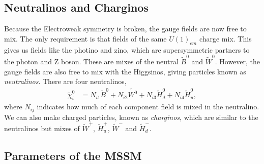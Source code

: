 \documentclass[twoside,english]{uiofysmaster}
\begin{document}
\subsection{Neutralinos and Charginos}

Because the Electroweak symmetry is broken, the gauge fields are now free to mix. The only requirement is that fields of the same $U(1)_{em}$ charge mix. This gives us fields like the photino and zino, which are supersymmetric partners to the photon and Z boson. These are mixes of the neutral $\tilde{B}^0$ and $\tilde{W}^0$. However, the gauge fields are also free to mix with the Higgsinos, giving particles known as \textit{neutralinos}. There are four neutralinos,
\begin{align}
\tilde{\chi}_i^0 &= N_{i1} \tilde{B}^0 + N_{i2} \tilde{W^0} + N_{i3} \tilde{H}_d^0 + N_{i4} \tilde{H}_u^0,
\end{align}
where $N_{ij}$ indicates how much of each component field is mixed in the neutralino. We can also make charged particles, known as \textit{charginos}, which are similar to the neutralinos but mixes of $\tilde{W}^+$, $\tilde{H}_u^+$, $\tilde{W}^-$ and $\tilde{H}_d^-$.


\subsection{Parameters of the MSSM}
\end{document}
